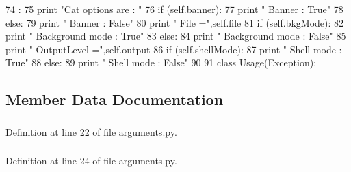 \begin{DoxyCode}
74                       :
75         print "Cat options are : "
76         if (self.banner):
77             print "   Banner          : True"
78         else:
79             print "   Banner          : False"
80         print "   File            =",self.file
81         if (self.bkgMode):
82             print "   Background mode : True"
83         else:
84             print "   Background mode : False"
85         print "   OutputLevel     =",self.output
86         if (self.shellMode):
87             print "   Shell mode      : True"
88         else:
89             print "   Shell mode      : False"
90 
91 
class Usage(Exception):
\end{DoxyCode}


\subsection{Member Data Documentation}
\hypertarget{classarguments_1_1arguments_ad5009df36196a2d5310e8cbddea033a9}{
\subsubsection[{banner}]{}}
\label{classarguments_1_1arguments_ad5009df36196a2d5310e8cbddea033a9}


Definition at line 22 of file arguments.py.\hypertarget{classarguments_1_1arguments_af2ec3aa45a7187dd9bcf33fd0553fca5}{
\subsubsection[{bkgMode}]{}}
\label{classarguments_1_1arguments_af2ec3aa45a7187dd9bcf33fd0553fca5}


Definition at line 24 of file arguments.py.\hypertarget{classarguments_1_1arguments_a48cb19b9b5f2884f9d7c555e013fb077}{
\subsubsection[{file}]{}}
\label{classarguments_1_1arguments_a48cb19b9b5f2884f9d7c555e013fb077}


